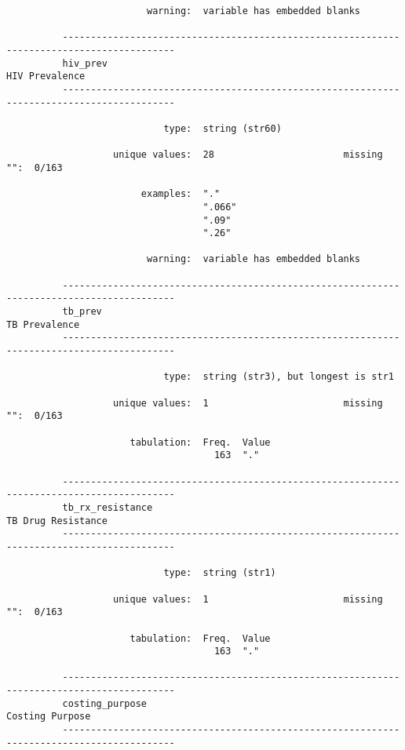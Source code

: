 \documentclass{article}
\begin{document}
\begin{verbatim}
                         warning:  variable has embedded blanks
          
          ------------------------------------------------------------------------------------------
          hiv_prev                                                                    HIV Prevalence
          ------------------------------------------------------------------------------------------
          
                            type:  string (str60)
          
                   unique values:  28                       missing "":  0/163
          
                        examples:  "."
                                   ".066"
                                   ".09"
                                   ".26"
          
                         warning:  variable has embedded blanks
          
          ------------------------------------------------------------------------------------------
          tb_prev                                                                      TB Prevalence
          ------------------------------------------------------------------------------------------
          
                            type:  string (str3), but longest is str1
          
                   unique values:  1                        missing "":  0/163
          
                      tabulation:  Freq.  Value
                                     163  "."
          
          ------------------------------------------------------------------------------------------
          tb_rx_resistance                                                        TB Drug Resistance
          ------------------------------------------------------------------------------------------
          
                            type:  string (str1)
          
                   unique values:  1                        missing "":  0/163
          
                      tabulation:  Freq.  Value
                                     163  "."
          
          ------------------------------------------------------------------------------------------
          costing_purpose                                                            Costing Purpose
          ------------------------------------------------------------------------------------------
          

\end{verbatim}
\end{document}
